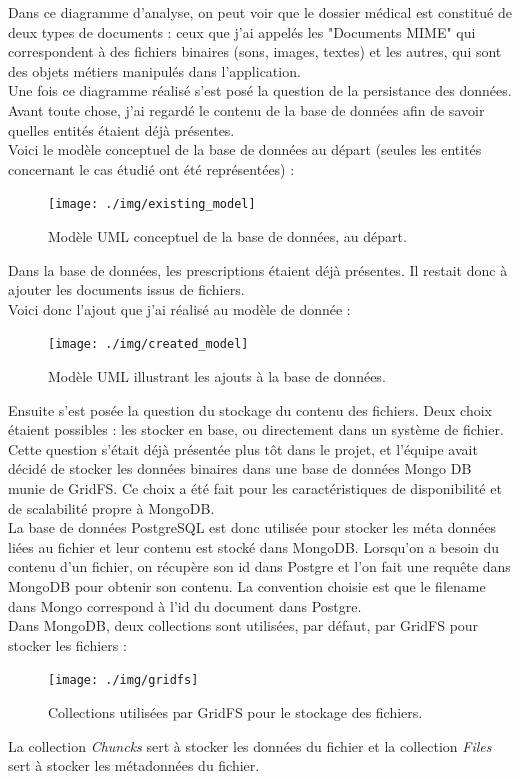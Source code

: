 Dans ce diagramme d'analyse, on peut voir que le dossier médical est constitué de deux types de documents : ceux que j'ai appelés les "Documents MIME" qui correspondent à des fichiers binaires (sons, images, textes) et les autres, qui sont des objets métiers manipulés dans l'application.\\

Une fois ce diagramme réalisé s'est posé la question de la persistance des données. Avant toute chose, j'ai regardé le contenu de la base de données afin de savoir quelles entités étaient déjà présentes.\\
Voici le modèle conceptuel de la base de données au départ (seules les entités concernant le cas étudié ont été représentées)  :

\begin{figure}[H]
  \centering
  \texttt{[image: ./img/existing\_model]}
  \caption{\label{fig:mb_va_ast} Modèle UML conceptuel de la base de données, au départ.}
\end{figure}

Dans la base de données, les prescriptions étaient déjà présentes. Il restait donc à ajouter les documents issus de fichiers. \\
Voici donc l'ajout que j'ai réalisé au modèle de donnée : 
\begin{figure}[H]
  \centering
  \texttt{[image: ./img/created\_model]}
  \caption{\label{fig:mb_va_ast} Modèle UML illustrant les ajouts à la base de données.}
\end{figure}

Ensuite s'est posée la question du stockage du contenu des fichiers. Deux choix étaient possibles : les stocker en base, ou directement dans un système de fichier. Cette question s'était déjà présentée plus tôt dans le projet, et l'équipe avait décidé de stocker les données binaires dans une base de données Mongo DB munie de GridFS. Ce choix a été fait pour les caractéristiques de disponibilité et de scalabilité propre à MongoDB.\\
La base de données PostgreSQL est donc utilisée pour stocker les méta données liées au fichier et leur contenu est stocké dans MongoDB. Lorsqu'on a besoin du contenu d'un fichier, on récupère son id dans Postgre et l'on fait une requête dans MongoDB pour obtenir son contenu. La convention choisie est que le filename dans Mongo correspond à l'id du document dans Postgre. \\

Dans MongoDB, deux collections sont utilisées, par défaut, par GridFS pour stocker les fichiers :  
\begin{figure}[H]
  \centering
  \texttt{[image: ./img/gridfs]}
  \caption{\label{fig:mb_va_ast} Collections utilisées par GridFS pour le stockage des fichiers.}
\end{figure}
La collection \textit{Chuncks} sert à stocker les données du fichier et la collection \textit{Files} sert à stocker les métadonnées du fichier.

